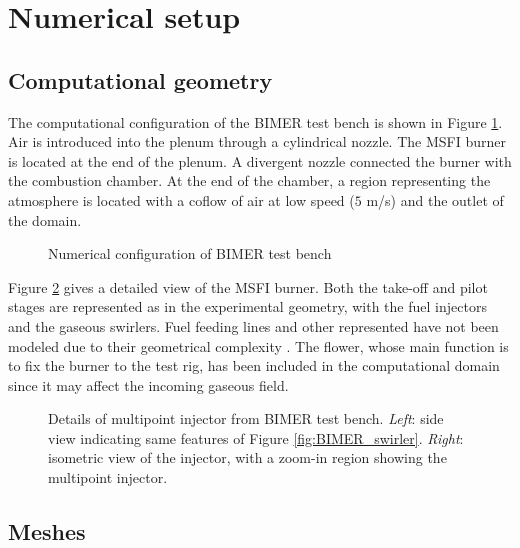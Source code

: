 \section{Numerical setup}


\subsection{Computational geometry}

The computational configuration of the BIMER test bench is shown in Figure \ref{fig:BIMER_geometry_full_domain}. Air is introduced into the plenum through a cylindrical nozzle. The MSFI burner is located at the end of the plenum. A divergent nozzle connected the burner with the combustion chamber. At the end of the chamber, a region representing the atmosphere is located with a coflow of air at low speed ($5$ m/s) and the outlet of the domain.  

\begin{figure}[h!]
	\centering
	\caption{Numerical configuration of BIMER test bench}
	\label{fig:BIMER_geometry_full_domain}
\end{figure}

Figure \ref{fig:BIMER_geometry_flower_details} gives a detailed view of the MSFI burner. Both the take-off and pilot stages are represented as in the experimental geometry, with the fuel injectors and the gaseous swirlers. Fuel feeding lines and other represented have not been modeled due to their geometrical complexity . The flower, whose main function is to fix the burner to the test rig, has been included in the computational domain since it may affect the incoming gaseous field.

\begin{figure}[h!]
	\centering
	\caption[Details of multipoint injector from BIMER test bench.]{Details of multipoint injector from BIMER test bench. \textsl{Left}: side view indicating same features of Figure \ref{fig:BIMER_swirler}. \textsl{Right}: isometric view of the injector, with a zoom-in region showing the multipoint injector.}
	\label{fig:BIMER_geometry_flower_details}
\end{figure}

\subsection{Meshes}

